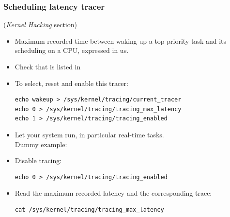 \begin{frame}[fragile]
  \frametitle{Scheduling latency tracer}
  \fontsize{9}{9}\selectfont
   ({\em Kernel Hacking} section)
  \begin{itemize}
  \item Maximum recorded time between waking up a top priority task
    and its scheduling on a CPU, expressed in us.
  \item Check that  is listed in
  \item To select, reset and enable this tracer:
    \begin{block}{}
\begin{verbatim}
echo wakeup > /sys/kernel/tracing/current_tracer
echo 0 > /sys/kernel/tracing/tracing_max_latency
echo 1 > /sys/kernel/tracing/tracing_enabled
\end{verbatim}
    \end{block}
  \item Let your system run, in particular real-time tasks.\\
    Dummy example: 
  \item Disable tracing:\\
    \begin{block}{}
\begin{verbatim}
echo 0 > /sys/kernel/tracing/tracing_enabled
\end{verbatim}
    \end{block}{}
  \item Read the maximum recorded latency and the corresponding trace:\\
    \begin{block}{}
\begin{verbatim}
cat /sys/kernel/tracing/tracing_max_latency
\end{verbatim}
    \end{block}{}
  \end{itemize}
\end{frame}

